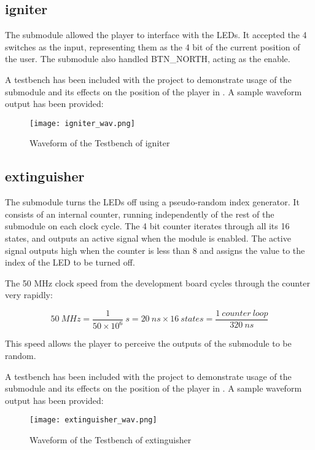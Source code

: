 \documentclass[paper=usletter, fontsize=12pt]{article}
\begin{document}
        \subsection{igniter}
        The  submodule allowed the player to interface with the LEDs. It accepted the 4 switches as the input, representing them as the 4 bit  of the current position of the user. The submodule also handled BTN\_NORTH, acting as the enable.

        A testbench has been included with the project to demonstrate usage of the submodule and its effects on the position of the player in . A sample waveform output has been provided:

        \begin{figure}[ht]
            \begin{center}
                \texttt{[image: igniter\_wav.png]}
                \caption{Waveform of the Testbench of igniter} \label{fig:igniter_wav}
            \end{center}
        \end{figure}
        \newpage

        \subsection{extinguisher}
        The  submodule turns the LEDs off using a pseudo-random index generator. It consists of an internal counter, running independently of the rest of the submodule on each clock cycle. The 4 bit counter iterates through all its 16 states, and outputs an active signal when the module is enabled. The active signal outputs high when the counter is less than 8 and assigns the value to the index of the LED to be turned off.

        The 50 MHz clock speed from the development board cycles through the counter very rapidly: 

         \[ 50 \ MHz=\frac{1}{50 \times 10^{6}} \ s=20 \ ns \times 16 \ states = \frac{1 \ counter \ loop}{320 \ ns} \]

        This speed allows the player to perceive the outputs of the submodule to be random.

        A testbench has been included with the project to demonstrate usage of the submodule and its effects on the position of the player in . A sample waveform output has been provided:

        \begin{figure}[ht]
            \begin{center}
                \texttt{[image: extinguisher\_wav.png]}
                \caption{Waveform of the Testbench of extinguisher} \label{fig:extinguisher_wav}
            \end{center}
        \end{figure}
        \newpage
\end{document}
